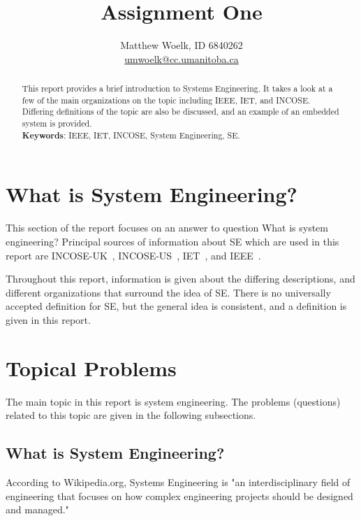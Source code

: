 \documentclass[a4paper,12pt]{article}
\title{Assignment One}
\author{Matthew Woelk, ID 6840262\\ \href{mailto:umwoelk@cc.umanitoba.ca}{umwoelk@cc.umanitoba.ca}}
\begin{document}
\maketitle
\thispagestyle{empty}

\tableofcontents

\newpage

\begin{abstract} 
This report provides a brief introduction to Systems Engineering.  It takes a look at a few of the main organizations on the topic including IEEE, IET, and INCOSE.  Differing definitions of the topic are also be discussed, and an example of an embedded system is provided.\\

{\bf Keywords}: IEEE, IET, INCOSE, System Engineering, SE. 

\end{abstract}


\section{What is System Engineering?}
This section of the report focuses on an answer to question What is system engineering?  Principal sources of information about SE which are used in this report are INCOSE-UK~\cite{INCOSE-UK}, INCOSE-US~\cite{INCOSE-US}, IET~\cite{IET}, and IEEE~\cite{IEEE}.

Throughout this report, information is given about the differing descriptions, and different organizations that surround the idea of SE. There is no universally accepted definition for SE, but the general idea is consistent, and a definition is given in this report.

\section{Topical Problems}
The main topic in this report is system engineering.  The problems (questions) related to this topic are given in the following subsections.

\subsection{What is System Engineering?}

According to Wikipedia.org, Systems Engineering is "an interdisciplinary field of engineering that focuses on how complex engineering projects should be designed and managed."\cite{wiki}  
\end{document}
